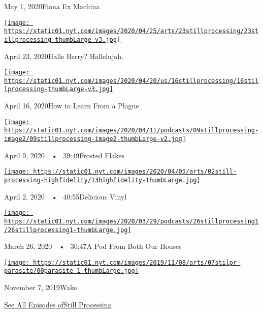 May 1, 2020Fiona Ex Machina

\href{https://www.nytimes.com/2020/04/23/podcasts/still-processing-halle-berry-sharon-stone-catwoman-quarantine.html?action=click\&module=audio-series-bar\&region=header\&pgtype=Article}{\texttt{[image: https://static01.nyt.com/images/2020/04/25/arts/23stillprocessing/23stillprocessing-thumbLarge-v3.jpg]}}

April 23, 2020Halle Berry? Hallelujah.

\href{https://www.nytimes.com/2020/04/16/podcasts/still-processing-AIDS-survive-coronavirus.html?action=click\&module=audio-series-bar\&region=header\&pgtype=Article}{\texttt{[image: https://static01.nyt.com/images/2020/04/20/us/16stillprocessing/16stillprocessing-thumbLarge-v3.jpg]}}

April 16, 2020How to Learn From a Plague

\href{https://www.nytimes.com/2020/04/09/podcasts/still-processing-tiger-king.html?action=click\&module=audio-series-bar\&region=header\&pgtype=Article}{\texttt{[image: https://static01.nyt.com/images/2020/04/11/podcasts/09stillprocessing-image2/09stillprocessing-image2-thumbLarge-v2.jpg]}}

April 9, 2020~~•~ 39:49Frosted Flakes

\href{https://www.nytimes.com/2020/04/02/podcasts/high-fidelity-zoe-kravitz.html?action=click\&module=audio-series-bar\&region=header\&pgtype=Article}{\texttt{[image: https://static01.nyt.com/images/2020/04/05/arts/02still-processing-highfidelity/13highfidelity-thumbLarge.jpg]}}

April 2, 2020~~•~ 40:55Delicious Vinyl

\href{https://www.nytimes.com/2020/03/26/podcasts/still-processing-quarantine.html?action=click\&module=audio-series-bar\&region=header\&pgtype=Article}{\texttt{[image: https://static01.nyt.com/images/2020/03/29/podcasts/26stillprocessing1/26stillprocessing1-thumbLarge.jpg]}}

March 26, 2020~~•~ 30:47A Pod From Both Our Houses

\href{https://www.nytimes.com/2019/11/07/podcasts/still-processing-parasite-watchmen-bong-joon-ho.html?action=click\&module=audio-series-bar\&region=header\&pgtype=Article}{\texttt{[image: https://static01.nyt.com/images/2019/11/08/arts/07stilpr-parasite/00parasite-1-thumbLarge.jpg]}}

November 7, 2019Wake

\href{https://www.nytimes.com/column/still-processing-podcast}{See All
Episodes ofStill Processing}

